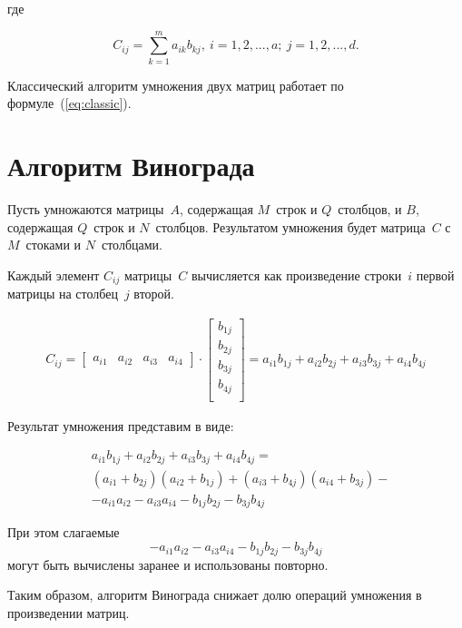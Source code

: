 где

\begin{equation}
	\label{eq:classic}
	C_{ij} = \sum\limits_{k=1}^m a_{ik}b_{kj},\ i = 1, 2, ..., a;\ j = 1, 2, ..., d. 
\end{equation}

Классический алгоритм \cite{classic} умножения двух матриц работает по формуле~(\ref{eq:classic}).

\section{Алгоритм Винограда}

Пусть умножаются матрицы~$A$, содержащая $M$~строк и $Q$~столбцов, и $B$, содержащая $Q$~строк и $N$~столбцов. Результатом умножения будет матрица~$C$ с $M$~стоками и $N$~столбцами.

Каждый элемент $C_{ij}$ матрицы~$C$ вычисляется как произведение строки~$i$ первой матрицы на столбец~$j$ второй.

\begin{multline}
C_{ij} = 
\left[ {\begin{array}{cccc}
		a_{i1} & a_{i2} & a_{i3} & a_{i4}
\end{array}}
\right] 
\cdot
\left[ {\begin{array}{c}
		b_{1j}\\
		b_{2j}\\
		b_{3j}\\
		b_{4j}\\
\end{array}}
\right] = 
a_{i1}b_{1j} + a_{i2}b_{2j} +a_{i3}b_{3j} + a_{i4}b_{4j}
\end{multline}

Результат умножения представим в виде:

\begin{equation}
\begin{split}
	&a_{i1}b_{1j} + a_{i2}b_{2j} +a_{i3}b_{3j} + a_{i4}b_{4j} =\\
	&(a_{i1} + b_{2j})(a_{i2} + b_{1j}) + (a_{i3} + b_{4j})(a_{i4} + b_{3j}) -\\
	&- a_{i1}a_{i2} - a_{i3}a_{i4} - b_{1j}b_{2j} - b_{3j}b_{4j}
\end{split}
\end{equation}

При этом слагаемые $$- a_{i1}a_{i2} - a_{i3}a_{i4} - b_{1j}b_{2j} - b_{3j}b_{4j}$$ могут быть вычислены заранее и использованы повторно.

Таким образом, алгоритм Винограда \cite{vinorgad} снижает долю операций умножения в произведении матриц.

